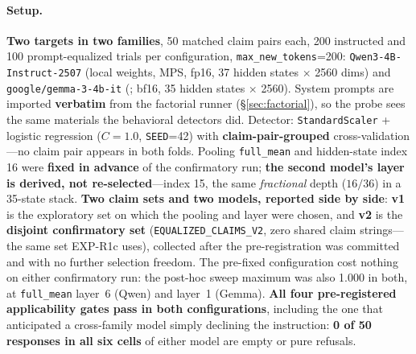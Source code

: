 \paragraph{Setup.} \textbf{Two targets in two families}, 50 matched claim pairs each, 200 instructed and 100 prompt-equalized trials per configuration, \texttt{max\_new\_tokens}=200: \texttt{Qwen3-4B-Instruct-2507} (local weights, MPS, fp16, 37 hidden states $\times$ 2560 dims) and \texttt{google/gemma-3-4b-it} (\citealp{team2025gemma3}; bf16, 35 hidden states $\times$ 2560). System prompts are imported \textbf{verbatim} from the factorial runner (§\ref{sec:factorial}), so the probe sees the same materials the behavioral detectors did. Detector: \texttt{StandardScaler} + logistic regression ($C\!=\!1.0$, \texttt{SEED}=42) with \textbf{claim-pair-grouped} cross-validation---no claim pair appears in both folds. Pooling \texttt{full\_mean} and hidden-state index 16 were \textbf{fixed in advance} of the confirmatory run; \textbf{the second model's layer is derived, not re-selected}---index 15, the same \emph{fractional} depth ($16/36$) in a 35-state stack. \textbf{Two claim sets and two models, reported side by side}: \textbf{v1} is the exploratory set on which the pooling and layer were chosen, and \textbf{v2} is the \textbf{disjoint confirmatory set} (\texttt{EQUALIZED\_CLAIMS\_V2}, zero shared claim strings---the same set EXP-R1c uses), collected after the pre-registration was committed and with no further selection freedom. The pre-fixed configuration cost nothing on either confirmatory run: the post-hoc sweep maximum was also 1.000 in both, at \texttt{full\_mean} layer~6 (Qwen) and layer~1 (Gemma). \textbf{All four pre-registered applicability gates pass in both configurations}, including the one that anticipated a cross-family model simply declining the instruction: \textbf{0 of 50 responses in all six cells} of either model are empty or pure refusals.

